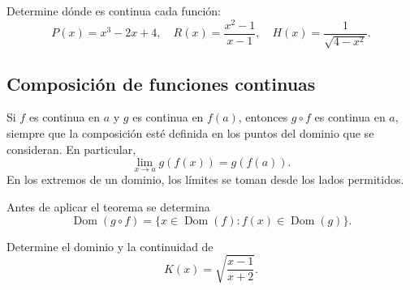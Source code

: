 \documentclass[10pt,a5paper]{article}
\newif\ifmostrarSoluciones
\begin{document}
\begin{ejemplo}
Determine dónde es continua cada función:
\[
  P(x)=x^3-2x+4,\quad
  R(x)=\frac{x^2-1}{x-1},\quad
  H(x)=\frac{1}{\sqrt{4-x^2}}.
\]
\end{ejemplo}
\ifmostrarSoluciones
\begin{solucion}
$P$ es continua en $\mathbb{R}$. La función $R$ es continua en $(-\infty,1)$ y $(1,\infty)$; la igualdad $R(x)=x+1$ vale solamente para $x\neq1$. En $1$ admite una extensión continua con valor $2$.

Para $H$, se exige $4-x^2>0$, equivalente a $-2<x<2$. La raíz es continua y el denominador no se anula en ese intervalo; por ello $H$ es continua en $(-2,2)$. Los extremos no pertenecen a su dominio.
\end{solucion}
\else\vspace{22mm}\fi

\subsection*{Composición de funciones continuas}

\begin{teorema}
Si $f$ es continua en $a$ y $g$ es continua en $f(a)$, entonces $g\circ f$ es continua en $a$, siempre que la composición esté definida en los puntos del dominio que se consideran. En particular,
\[
  \lim_{x\to a}g(f(x))=g(f(a)).
\]
En los extremos de un dominio, los límites se toman desde los lados permitidos.
\end{teorema}

Antes de aplicar el teorema se determina
\[
  \operatorname{Dom}(g\circ f)
  =\{x\in\operatorname{Dom}(f):f(x)\in\operatorname{Dom}(g)\}.
\]

\begin{ejemplo}
Determine el dominio y la continuidad de
\[
  K(x)=\sqrt{\frac{x-1}{x+2}}.
\]
\end{ejemplo}
\ifmostrarSoluciones
\begin{solucion}
La función interior es racional y la exterior es una raíz cuadrada. Debemos exigir
\[
  x\neq-2,\qquad \frac{x-1}{x+2}\geq0.
\]
El cociente es positivo en $(-\infty,-2)$ y $(1,\infty)$, negativo en $(-2,1)$ y cero en $1$. Así,
\[
  \operatorname{Dom}(K)=(-\infty,-2)\cup[1,\infty).
\]
En los interiores de esos intervalos, $K$ es continua por composición. En $1$,
\[
  \lim_{x\to1^+}K(x)=0=K(1).
\]
Por tanto, es continua en ambos intervalos indicados, con continuidad por la derecha en $1$. El punto $-2$ permanece excluido.
\end{solucion}
\else\vspace{26mm}\fi
\end{document}
